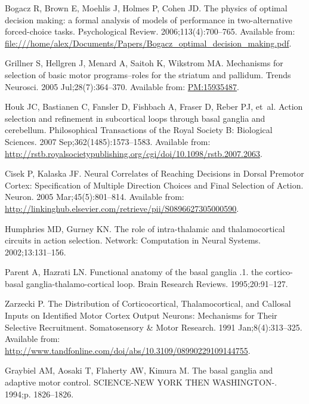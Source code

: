 \documentclass[10pt,letterpaper]{article}
\begin{document}
\begin{thebibliography}{10}
Bogacz R, Brown E, Moehlis J, Holmes P, Cohen JD.
\newblock The physics of optimal decision making: a formal analysis of models
  of performance in two-alternative forced-choice tasks.
\newblock Psychological Review. 2006;113(4):700--765.
\newblock Available from:
  \url{file:///home/alex/Documents/Papers/Bogacz_optimal_decision_making.pdf}.

Grillner S, Hellgren J, Menard A, Saitoh K, Wikstrom MA.
\newblock Mechanisms for selection of basic motor programs–roles for the
  striatum and pallidum.
\newblock Trends Neurosci. 2005 Jul;28(7):364--370.
\newblock Available from: \url{PM:15935487}.

Houk JC, Bastianen C, Fansler D, Fishbach A, Fraser D, Reber PJ, et~al.
\newblock Action selection and refinement in subcortical loops through basal
  ganglia and cerebellum.
\newblock Philosophical Transactions of the Royal Society B: Biological
  Sciences. 2007 Sep;362(1485):1573--1583.
\newblock Available from:
  \url{http://rstb.royalsocietypublishing.org/cgi/doi/10.1098/rstb.2007.2063}.

Cisek P, Kalaska JF.
\newblock Neural {Correlates} of {Reaching} {Decisions} in {Dorsal} {Premotor}
  {Cortex}: {Specification} of {Multiple} {Direction} {Choices} and {Final}
  {Selection} of {Action}.
\newblock Neuron. 2005 Mar;45(5):801--814.
\newblock Available from:
  \url{http://linkinghub.elsevier.com/retrieve/pii/S0896627305000590}.

Humphries MD, Gurney KN.
\newblock The role of intra-thalamic and thalamocortical circuits in action
  selection.
\newblock Network: Computation in Neural Systems. 2002;13:131--156.

Parent A, Hazrati LN.
\newblock Functional anatomy of the basal ganglia .1. the cortico-basal
  ganglia-thalamo-cortical loop.
\newblock Brain Research Reviews. 1995;20:91--127.

Zarzecki P.
\newblock The {Distribution} of {Corticocortical}, {Thalamocortical}, and
  {Callosal} {Inputs} on {Identified} {Motor} {Cortex} {Output} {Neurons}:
  {Mechanisms} for {Their} {Selective} {Recruitment}.
\newblock Somatosensory \& Motor Research. 1991 Jan;8(4):313--325.
\newblock Available from:
  \url{http://www.tandfonline.com/doi/abs/10.3109/08990229109144755}.

Graybiel AM, Aosaki T, Flaherty AW, Kimura M.
\newblock The basal ganglia and adaptive motor control.
\newblock SCIENCE-NEW YORK THEN WASHINGTON-. 1994;p. 1826--1826.


\end{thebibliography}
\end{document}
